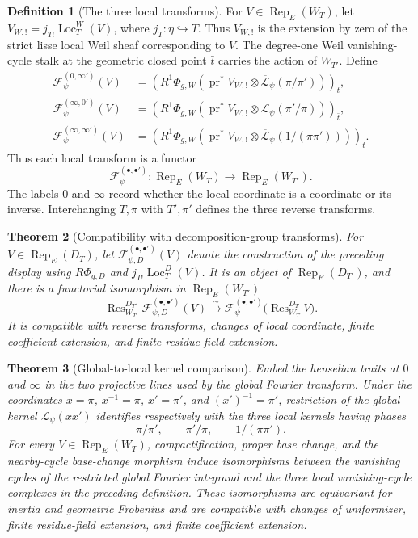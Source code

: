 \documentclass[10pt]{article}
\newtheorem{theorem}{Theorem}[section]
\theoremstyle{definition}
\newtheorem{definition}[theorem]{Definition}
\newcommand{\Rep}{\operatorname{Rep}}
\begin{document}
\begin{definition}[The three local transforms]
For \(V\in\Rep_E(W_T)\), let
\(V_{W,!}=j_{T!}\operatorname{Loc}_T^W(V)\), where
\(j_T:\eta\hookrightarrow T\).  Thus \(V_{W,!}\) is the extension by
zero of the strict lisse local Weil sheaf corresponding to \(V\).  The
degree-one Weil vanishing-cycle stalk at the geometric closed point
\(\bar t\) carries the action of \(W_{T'}\).  Define
\[
\begin{aligned}
 \mathcal F_\psi^{(0,\infty')}(V)
  &=\left(R^1\Phi_{g,W}
     (\operatorname{pr}^*V_{W,!}\otimes
      \overline{\mathcal L}_\psi(\pi/\pi'))\right)_{\bar t},\\
 \mathcal F_\psi^{(\infty,0')}(V)
  &=\left(R^1\Phi_{g,W}
     (\operatorname{pr}^*V_{W,!}\otimes
      \overline{\mathcal L}_\psi(\pi'/\pi))\right)_{\bar t},\\
 \mathcal F_\psi^{(\infty,\infty')}(V)
  &=\left(R^1\Phi_{g,W}
     (\operatorname{pr}^*V_{W,!}\otimes
      \overline{\mathcal L}_\psi(1/(\pi\pi')))\right)_{\bar t}.
\end{aligned}
\]
Thus each local transform is a functor
\[
       \mathcal F_\psi^{(\bullet,\bullet')}:
       \Rep_E(W_T)\longrightarrow\Rep_E(W_{T'}).
\]
The labels \(0\) and \(\infty\) record whether the local coordinate is a
coordinate or its inverse.  Interchanging \(T,\pi\) with \(T',\pi'\)
defines the three reverse transforms.
\end{definition}

\begin{theorem}[Compatibility with decomposition-group transforms]
For \(V\in\Rep_E(D_T)\), let
\(\mathcal F_{\psi,D}^{(\bullet,\bullet')}(V)\) denote the construction of
the preceding display using \(R\Phi_{g,D}\) and
\(j_{T!}\operatorname{Loc}_T^D(V)\).  It is an object of
\(\Rep_E(D_{T'})\), and there is a
functorial isomorphism in \(\Rep_E(W_{T'})\)
\[
 \operatorname{Res}^{D_{T'}}_{W_{T'}}
   \mathcal F_{\psi,D}^{(\bullet,\bullet')}(V)
 \xrightarrow{\sim}
 \mathcal F_\psi^{(\bullet,\bullet')}
   \bigl(\operatorname{Res}^{D_T}_{W_T}V\bigr).
\]
It is compatible with reverse transforms, changes of local coordinate,
finite coefficient extension, and finite residue-field extension.
\end{theorem}

\begin{theorem}[Global-to-local kernel comparison]
Embed the henselian traits at \(0\) and \(\infty\) in the two projective
lines used by the global Fourier transform.  Under the coordinates
\(x=\pi\), \(x^{-1}=\pi\), \(x'=\pi'\), and
\((x')^{-1}=\pi'\), restriction of the global kernel
\(\mathcal L_\psi(xx')\) identifies respectively with the three local
kernels having phases
\[
 \pi/\pi',\qquad \pi'/\pi,\qquad 1/(\pi\pi').
\]
For every \(V\in\Rep_E(W_T)\), compactification, proper base change,
and the nearby-cycle base-change morphism induce isomorphisms between the
vanishing cycles of the restricted global Fourier integrand and the three
local vanishing-cycle complexes in the preceding definition.  These
isomorphisms are equivariant for inertia and geometric Frobenius and are
compatible with changes of uniformizer, finite residue-field extension,
and finite coefficient extension.
\end{theorem}
\end{document}
